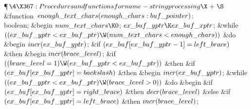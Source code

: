 \Y\P$\4\X367:Procedures and functions for name-string processing\X\mathrel{+}%
\S$\6
\4\&{function}\1\  $\\{enough\_text\_chars}(\\{enough\_chars}:\\{buf%
\_pointer})$: \\{boolean};\2\6
\&{begin} $\\{num\_text\_chars}\K0$;\5
$\\{ex\_buf\_yptr}\K\\{ex\_buf\_xptr}$;\6
\&{while} $((\\{ex\_buf\_yptr}<\\{ex\_buf\_ptr})\W(\\{num\_text\_chars}<%
\\{enough\_chars}))$ \1\&{do}\6
\&{begin} $\\{incr}(\\{ex\_buf\_yptr})$;\6
\&{if} $(\\{ex\_buf}[\\{ex\_buf\_yptr}-1]=\\{left\_brace})$ \1\&{then}\6
\&{begin} $\\{incr}(\\{brace\_level})$;\6
\&{if} $((\\{brace\_level}=1)\W(\\{ex\_buf\_yptr}<\\{ex\_buf\_ptr}))$ \1%
\&{then}\6
\&{if} $(\\{ex\_buf}[\\{ex\_buf\_yptr}]=\\{backslash})$ \1\&{then}\6
\&{begin} $\\{incr}(\\{ex\_buf\_yptr})$;\6
\&{while} $((\\{ex\_buf\_yptr}<\\{ex\_buf\_ptr})\W(\\{brace\_level}>0))$ \1%
\&{do}\6
\&{begin} \&{if} $(\\{ex\_buf}[\\{ex\_buf\_yptr}]=\\{right\_brace})$ \1%
\&{then}\5
$\\{decr}(\\{brace\_level})$\6
\4\&{else} \&{if} $(\\{ex\_buf}[\\{ex\_buf\_yptr}]=\\{left\_brace})$ \1\&{then}%
\5
$\\{incr}(\\{brace\_level})$;\2\2\6
